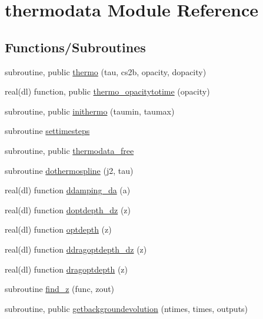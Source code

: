\hypertarget{namespacethermodata}{}\section{thermodata Module Reference}
\label{namespacethermodata}
\subsection*{Functions/\+Subroutines}
\begin{DoxyCompactItemize}
\item 
subroutine, public \mbox{\hyperlink{namespacethermodata_a9ff7d8c599c64921c554cbc2069b3d2b}{thermo}} (tau, cs2b, opacity, dopacity)
\item 
real(dl) function, public \mbox{\hyperlink{namespacethermodata_ac4c3a9846b711f25cba7ce38322ee66b}{thermo\+\_\+opacitytotime}} (opacity)
\item 
subroutine, public \mbox{\hyperlink{namespacethermodata_a6d995eb9ad9f563fec198222c168e097}{inithermo}} (taumin, taumax)
\item 
subroutine \mbox{\hyperlink{namespacethermodata_a53958f3aa160bfde722bffb2b9d47df8}{settimesteps}}
\item 
subroutine, public \mbox{\hyperlink{namespacethermodata_a29f627a601dcc5afc90dc9ea8e4d902a}{thermodata\+\_\+free}}
\item 
subroutine \mbox{\hyperlink{namespacethermodata_a1c7e7a0884bd2117c1d24a1ce8d5aaf1}{dothermospline}} (j2, tau)
\item 
real(dl) function \mbox{\hyperlink{namespacethermodata_a78b5c4ff5e2d2d472df5aae9bdd02d77}{ddamping\+\_\+da}} (a)
\item 
real(dl) function \mbox{\hyperlink{namespacethermodata_afdafed82de5a75a5b609d945a91836fa}{doptdepth\+\_\+dz}} (z)
\item 
real(dl) function \mbox{\hyperlink{namespacethermodata_a3875da8b58196788145c8f6df6ea6cfe}{optdepth}} (z)
\item 
real(dl) function \mbox{\hyperlink{namespacethermodata_a3d2fe3077a350ae407ecb93f927b2cc4}{ddragoptdepth\+\_\+dz}} (z)
\item 
real(dl) function \mbox{\hyperlink{namespacethermodata_ac14b857825ae37eee1107a320f7d71f7}{dragoptdepth}} (z)
\item 
subroutine \mbox{\hyperlink{namespacethermodata_a402bcd30314032d575f841bf374ad320}{find\+\_\+z}} (func, zout)
\item 
subroutine, public \mbox{\hyperlink{namespacethermodata_a94d40d05e68eca4db87b58269d19e6f3}{getbackgroundevolution}} (ntimes, times, outputs)
\end{DoxyCompactItemize}

